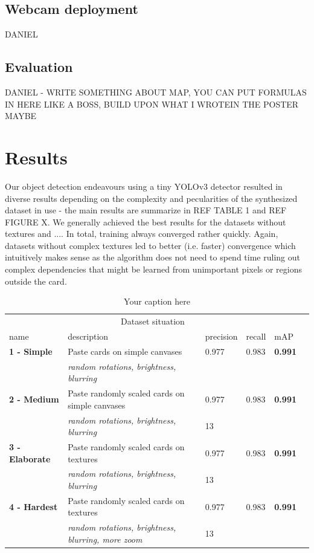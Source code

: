\documentclass[a4paper]{article}
\begin{document}
\subsection{Webcam deployment}
DANIEL
\subsection{Evaluation}
DANIEL - WRITE SOMETHING ABOUT MAP, YOU CAN PUT FORMULAS IN HERE LIKE A BOSS, BUILD UPON WHAT I WROTEIN THE POSTER MAYBE
\section{Results}
Our object detection endeavours using a tiny YOLOv3 detector resulted in diverse results depending on the complexity and pecularities of the synthesized dataset in use - the main results are summarize in REF TABLE 1 and REF FIGURE X. We generally achieved the best results for the datasets without textures and ....
In total, training always converged rather quickly. Again, datasets without complex textures led to better (i.e. faster) convergence which intuitively makes sense as the algorithm does not need to spend time ruling out complex dependencies that might be learned from unimportant pixels or regions outside the card.\\
\begin{table}[h]

\begin{tabular}{lllllr}
\hline
\multicolumn{5}{c}{Dataset situation} \\
\cline{1-2}
name    & description  & precision & recall & mAP \\
\hline
\textbf{1 - Simple}      & Paste cards on simple canvases    &  0.977  & 0.983 & \textbf{0.991} \\
          & \textit{random rotations, brightness, blurring}     &  & & \\
\textbf{2 - Medium}      & Paste randomly scaled cards on simple canvases & 0.977 & 0.983 & \textbf{0.991} \\
          & \textit{random rotations, brightness, blurring}     &  13 & & \\
\textbf{3 - Elaborate}       & Paste randomly scaled cards on textures & 0.977 & 0.983 & \textbf{0.991} \\
          & \textit{random rotations, brightness, blurring}     &  13 & & \\
\textbf{4 - Hardest} & Paste randomly scaled cards on textures & 0.977 & 0.983 & \textbf{0.991} \\
          & \textit{random rotations, brightness, blurring, more zoom}     &  13 & & \\
\hline


\end{tabular}
\caption{Your caption here} 
\end{table}
\end{document}
